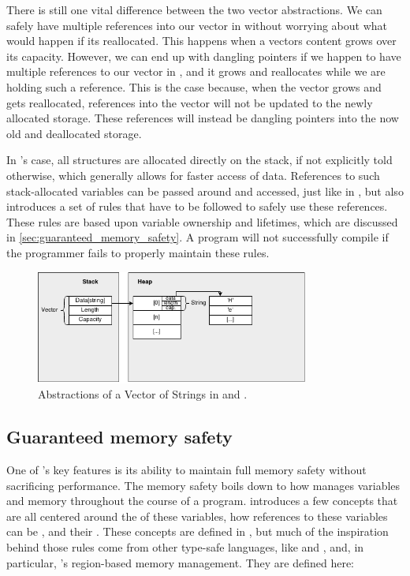 There is still one vital difference between the two vector abstractions.
We can safely have multiple references into our vector in {\Java} without worrying about what would happen if its reallocated.
This happens when a vectors content grows over its capacity.
However, we can end up with dangling pointers if we happen to have multiple references to our vector in {\Cpp}, and it grows and reallocates while we are holding such a reference.
This is the case because, when the vector grows and gets reallocated, references into the vector will not be updated to the newly allocated storage.
These references will instead be dangling pointers into the now old and deallocated storage.

In {\rust}'s case, all structures are allocated directly on the stack, if not explicitly told otherwise, which generally allows for faster access of data.
References to such stack-allocated variables can be passed around and accessed, just like in {\Cpp},
but {\rust} also introduces a set of rules that have to be followed to safely use these references.
These rules are based upon variable ownership and lifetimes, which are discussed in \autoref{sec:guaranteed_memory_safety}.
A {\rust} program will not successfully compile if the programmer fails to properly maintain these rules.

\begin{figure}[tb]
  \begin{center}
    \includegraphics[width=0.8\textwidth]{figures/cpp_abstractions}
  \end{center}
  \caption{Abstractions of a Vector of Strings in {\rust} and {\Cpp}.}
  \label{fig:cpp_abstractions}
\end{figure}

\subsection{Guaranteed memory safety}
\label{sec:guaranteed_memory_safety}

One of {\rust}'s key features is its ability to maintain full memory safety without sacrificing performance.
The memory safety boils down to how {\rust} manages variables and memory throughout the course of a program.
{\rust} introduces a few concepts that are all centered around the  of these variables, how references to these variables can be , and their .
These concepts are defined in {\rust}, but much of the inspiration behind those rules come from other type-safe languages, like {} and {}, and, in particular, {}'s \cite{Grossman2002,Swamy2006} region-based memory management.
They are defined here:

